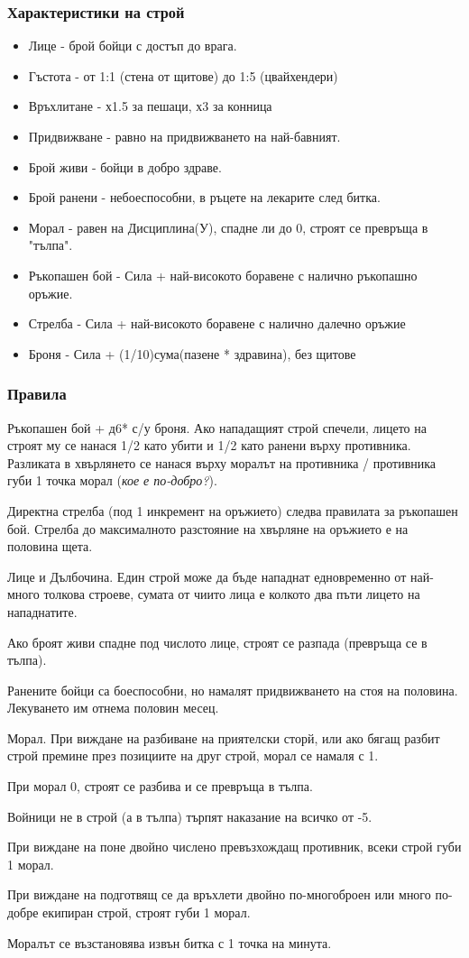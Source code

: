 \subsubsection{Характеристики на строй}
\begin{itemize}
\item{Лице - брой бойци с достъп до врага.}
\item{Гъстота - от 1:1 (стена от щитове) до 1:5 (цвайхендери)}
\item{Връхлитане - х1.5 за пешаци, х3 за конница}
\item{Придвижване - равно на придвижването на най-бавният.}

\item{Брой живи - бойци в добро здраве.}
\item{Брой ранени - небоеспособни, в ръцете на лекарите след битка.}
\item{Морал - равен на Дисциплина(У), спадне ли до 0, строят се превръща в "тълпа".}

\item{Ръкопашен бой - Сила + най-високото боравене с налично ръкопашно оръжие.}
\item{Стрелба - Сила + най-високото боравене с налично далечно оръжие}
\item{Броня - Сила + (1/10)сума(пазене * здравина), без щитове}
\end{itemize}
\subsubsection{Правила}
Ръкопашен бой + д6* с/у броня. Ако нападащият строй спечели, лицето на строят му се нанася 1/2 като убити и 1/2 като ранени върху противника. Разликата в хвърлянето се нанася върху моралът на противника / противника губи 1 точка морал (\textit{кое е по-добро?}).

Директна стрелба (под 1 инкремент на оръжието) следва правилата за ръкопашен бой. Стрелба до максималното разстояние на хвърляне на оръжието е на половина щета.

Лице и Дълбочина. Един строй може да бъде нападнат едновременно от най-много толкова строеве, сумата от чиито лица е колкото два пъти лицето на  нападнатите.

Ако броят живи спадне под числото лице, строят се разпада (превръща се в тълпа).

Ранените бойци са боеспособни, но намалят придвижването на стоя на половина. Лекуването им отнема половин месец.

Морал. При виждане на разбиване на приятелски сторй, или ако бягащ разбит строй премине през позициите на друг строй, морал се намаля с 1.

При морал 0, строят се разбива и се превръща в тълпа.

Войници не в строй (а в тълпа) търпят наказание на всичко от -5.

При виждане на поне двойно числено превъзхождащ противник, всеки строй губи 1 морал.

При виждане на подготвящ се да връхлети двойно по-многоброен или много по-добре екипиран строй, строят губи 1 морал.

Моралът се възстановява извън битка с 1 точка на минута.
